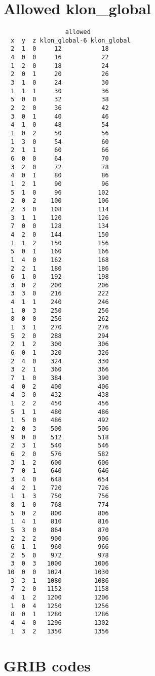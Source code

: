 \documentclass{article}
\begin{document}
\section{Allowed klon\_global}
\label{app:AllowedNLON}
\begin{verbatim}
                 allowed 
  x  y  z klon_global-6 klon_global
  2  1  0     12           18
  4  0  0     16           22
  1  2  0     18           24
  2  0  1     20           26
  3  1  0     24           30
  1  1  1     30           36
  5  0  0     32           38
  2  2  0     36           42
  3  0  1     40           46
  4  1  0     48           54
  1  0  2     50           56
  1  3  0     54           60
  2  1  1     60           66
  6  0  0     64           70
  3  2  0     72           78
  4  0  1     80           86
  1  2  1     90           96
  5  1  0     96          102
  2  0  2    100          106
  2  3  0    108          114
  3  1  1    120          126
  7  0  0    128          134
  4  2  0    144          150
  1  1  2    150          156
  5  0  1    160          166
  1  4  0    162          168
  2  2  1    180          186
  6  1  0    192          198
  3  0  2    200          206
  3  3  0    216          222
  4  1  1    240          246
  1  0  3    250          256
  8  0  0    256          262
  1  3  1    270          276
  5  2  0    288          294
  2  1  2    300          306
  6  0  1    320          326
  2  4  0    324          330
  3  2  1    360          366
  7  1  0    384          390
  4  0  2    400          406
  4  3  0    432          438
  1  2  2    450          456
  5  1  1    480          486
  1  5  0    486          492
  2  0  3    500          506
  9  0  0    512          518
  2  3  1    540          546
  6  2  0    576          582
  3  1  2    600          606
  7  0  1    640          646
  3  4  0    648          654
  4  2  1    720          726
  1  1  3    750          756
  8  1  0    768          774
  5  0  2    800          806
  1  4  1    810          816
  5  3  0    864          870
  2  2  2    900          906
  6  1  1    960          966
  2  5  0    972          978
  3  0  3   1000         1006
 10  0  0   1024         1030
  3  3  1   1080         1086
  7  2  0   1152         1158
  4  1  2   1200         1206
  1  0  4   1250         1256
  8  0  1   1280         1286
  4  4  0   1296         1302
  1  3  2   1350         1356
\end{verbatim}

\newpage
\section{GRIB codes}
\label{app:gribcodes}
\end{document}
